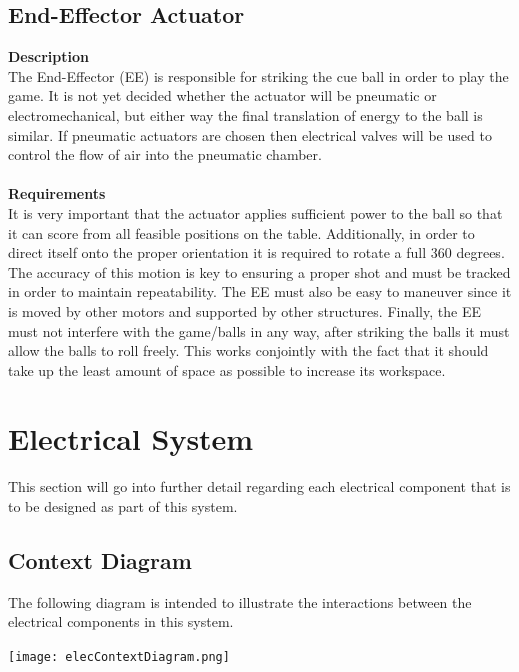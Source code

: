 \documentclass[titlepage]{article}
\begin{document}
\begin{center}
\begin{center}
\begin{center}
\begin{center}
\begin{center}
\begin{center}
\begin{center}
\begin{center}
\begin{center}
\begin{center}
\begin{center}
\begin{center}
\begin{center}
\begin{center}
\begin{center}
\begin{center}
\begin{center}
\begin{center}
\begin{center}
\begin{center}
\subsection{End-Effector Actuator}
\textbf{Description}\\
The End-Effector (EE) is responsible for striking the cue ball in order to play the game. It is not yet decided whether the actuator will be pneumatic or electromechanical, but either way the final translation of energy to the ball is similar. If pneumatic actuators are chosen then electrical valves will be used to control the flow of air into the pneumatic chamber.\\\\
\textbf{Requirements}\\
It is very important that the actuator applies sufficient power to the ball so that it can score from all feasible positions on the table. Additionally, in order to direct itself onto the proper orientation it is required to rotate a full 360 degrees. The accuracy of this motion is key to ensuring a proper shot and must be tracked in order to maintain repeatability. The EE must also be easy to maneuver since it is moved by other motors and supported by other structures. Finally, the EE must not interfere with the game/balls in any way, after striking the balls it must allow the balls to roll freely. This works conjointly with the fact that it should take up the least amount of space as possible to increase its workspace.



\section{Electrical System}
This section will go into further detail regarding each electrical component that is to be designed as part of this system.
\subsection{Context Diagram}
The following diagram is intended to illustrate the interactions between the electrical components in this system.
\begin{center}
	\texttt{[image: elecContextDiagram.png]}
\label{fig:elecContextDiagramFig}
\end{center}


\end{center}
\end{center}
\end{center}
\end{center}
\end{center}
\end{center}
\end{center}
\end{center}
\end{center}
\end{center}
\end{center}
\end{center}
\end{center}
\end{center}
\end{center}
\end{center}
\end{center}
\end{center}
\end{center}
\end{center}
\end{document}
